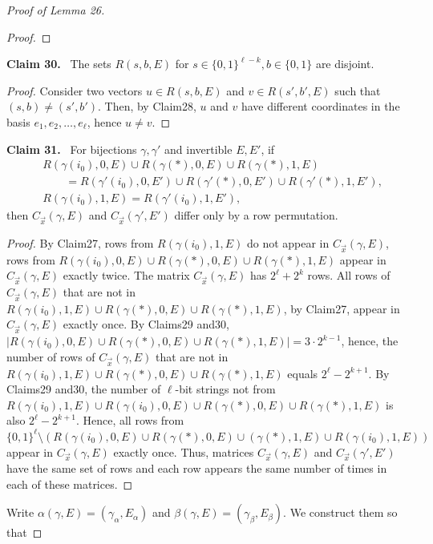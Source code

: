 \documentclass[10pt,a4paper]{article}
\newenvironment{authorclaim}[1]{\par\medskip\noindent\textbf{#1.}\ \ignorespaces}{\par\medskip}
\begin{document}
\begin{proof}[Proof of Lemma 26]
\begin{proof}
\end{proof}
\begin{authorclaim}{Claim 30}
The sets $R(s,b,E)$ for $s\in\{0,1\}^{\ell-k},b\in\{0,1\}$ are disjoint.
\end{authorclaim}
\begin{proof}
Consider two vectors $u\in R(s,b,E)$ and $v\in R(s',b',E)$ such that $(s,b)\ne(s',b')$. Then, by Claim28, $u$ and $v$ have different coordinates in the basis $e_1,e_2,\ldots,e_\ell$, hence $u\ne v$.
\end{proof}
\begin{authorclaim}{Claim 31}
For bijections $\gamma,\gamma'$ and invertible $E,E'$, if
\begin{align*}
&R(\gamma(i_0),0,E)\cup R(\gamma(*),0,E)\cup R(\gamma(*),1,E)\\
&\qquad=R(\gamma'(i_0),0,E')\cup R(\gamma'(*),0,E')\cup R(\gamma'(*),1,E'),\\
&R(\gamma(i_0),1,E)=R(\gamma'(i_0),1,E'),
\end{align*}
then $C_{\vec x}(\gamma,E)$ and $C_{\vec x}(\gamma',E')$ differ only by a row permutation.
\end{authorclaim}
\begin{proof}
By Claim27, rows from $R(\gamma(i_0),1,E)$ do not appear in $C_{\vec x}(\gamma,E)$, rows from $R(\gamma(i_0),0,E)\cup R(\gamma(*),0,E)\cup R(\gamma(*),1,E)$ appear in $C_{\vec x}(\gamma,E)$ exactly twice. The matrix $C_{\vec x}(\gamma,E)$ has $2^\ell+2^k$ rows. All rows of $C_{\vec x}(\gamma,E)$ that are not in $R(\gamma(i_0),1,E)\cup R(\gamma(*),0,E)\cup R(\gamma(*),1,E)$, by Claim27, appear in $C_{\vec x}(\gamma,E)$ exactly once.
By Claims29 and30, $|R(\gamma(i_0),0,E)\cup R(\gamma(*),0,E)\cup R(\gamma(*),1,E)|=3\cdot2^{k-1}$, hence, the number of rows of $C_{\vec x}(\gamma,E)$ that are not in $R(\gamma(i_0),1,E)\cup R(\gamma(*),0,E)\cup R(\gamma(*),1,E)$ equals $2^\ell-2^{k+1}$. By Claims29 and30, the number of $\ell$-bit strings not from $R(\gamma(i_0),1,E)\cup R(\gamma(i_0),0,E)\cup R(\gamma(*),0,E)\cup R(\gamma(*),1,E)$ is also $2^\ell-2^{k+1}$. Hence, all rows from $\{0,1\}^\ell\setminus(R(\gamma(i_0),0,E)\cup R(\gamma(*),0,E)\cup(\gamma(*),1,E)\cup R(\gamma(i_0),1,E))$ appear in $C_{\vec x}(\gamma,E)$ exactly once. Thus, matrices $C_{\vec x}(\gamma,E)$ and $C_{\vec x}(\gamma',E')$ have the same set of rows and each row appears the same number of times in each of these matrices.
\end{proof}
Write $\alpha(\gamma,E)=(\gamma_\alpha,E_\alpha)$ and $\beta(\gamma,E)=(\gamma_\beta,E_\beta)$. We construct them so that

\end{proof}
\end{document}
